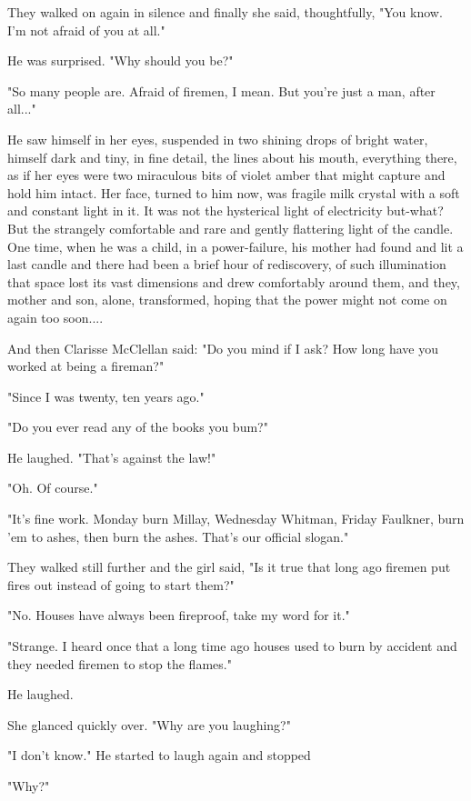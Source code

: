 \documentclass[10pt,a4paper]{article}
\begin{document}
They walked on again in silence and finally she said, 
thoughtfully, "You know. I'm not afraid of you at all." 

He was surprised. "Why should you be?" 

"So many people are. Afraid of firemen, I mean. But 
you're just a man, after all..." 

He saw himself in her eyes, suspended in two shining 
drops of bright water, himself dark and tiny, in fine detail, 
the lines about his mouth, everything there, as if her eyes 
were two miraculous bits of violet amber that might capture 
and hold him intact. Her face, turned to him now, was fragile 
milk crystal with a soft and constant light in it. It was not the 
hysterical light of electricity but-what? But the strangely 
comfortable and rare and gently flattering light of the 
candle. One time, when he was a child, in a power-failure, 
his mother had found and lit a last candle and there had 
been a brief hour of rediscovery, of such illumination that 
space lost its vast dimensions and drew comfortably around 
them, and they, mother and son, alone, transformed, hoping 
that the power might not come on again too soon.... 

And then Clarisse McClellan said: "Do you mind if I 
ask? How long have you worked at being a fireman?" 

"Since I was twenty, ten years ago." 

"Do you ever read any of the books you bum?" 

He laughed. "That's against the law!" 

"Oh. Of course." 

"It's fine work. Monday burn Millay, Wednesday 
Whitman, Friday Faulkner, burn 'em to ashes, then burn the 
ashes. That's our official slogan." 

They walked still further and the girl said, "Is it true 
that long ago firemen put fires out instead of going to start 
them?" 

"No. Houses have always been fireproof, take my 
word for it." 

"Strange. I heard once that a long time ago houses 
used to burn by accident and they needed firemen to stop 
the flames." 

He laughed. 

She glanced quickly over. "Why are you laughing?" 

"I don't know." He started to laugh again and stopped 

"Why?" 
\end{document}
